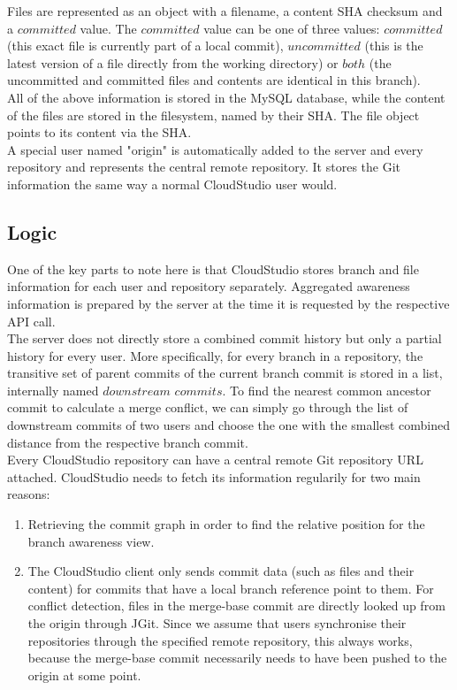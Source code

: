Files are represented as an object with a filename, a content SHA checksum and a $committed$ value. The $committed$ value can be one of three values: $committed$ (this exact file is currently part of a local commit), $uncommitted$ (this is the latest version of a file directly from the working directory) or $both$ (the uncommitted and committed files and contents are identical in this branch). \\

All of the above information is stored in the MySQL database, while the content of the files are stored in the filesystem, named by their SHA. The file object points to its content via the SHA. \\

A special user named "origin" is automatically added to the server and every repository and represents the central remote repository. It stores the Git information the same way a normal CloudStudio user would.

\subsection{Logic}

One of the key parts to note here is that CloudStudio stores branch and file information for each user and repository separately. Aggregated awareness information is prepared by the server at the time it is requested by the respective API call. \\

The server does not directly store a combined commit history but only a partial history for every user. More specifically, for every branch in a repository, the transitive set of parent commits of the current branch commit is stored in a list, internally named $downstream$ $commits$. To find the nearest common ancestor commit to calculate a merge conflict, we can simply go through the list of downstream commits of two users and choose the one with the smallest combined distance from the respective branch commit. \\

Every CloudStudio repository can have a central remote Git repository URL attached. CloudStudio needs to fetch its information regularily for two main reasons:

\begin{enumerate}
\item Retrieving the commit graph in order to find the relative position for the branch awareness view.
\item The CloudStudio client only sends commit data (such as files and their content) for commits that have a local branch reference point to them. For conflict detection, files in the merge-base commit are directly looked up from the origin through JGit. Since we assume that users synchronise their repositories through the specified remote repository, this always works, because the merge-base commit necessarily needs to have been pushed to the origin at some point.
\end{enumerate}


